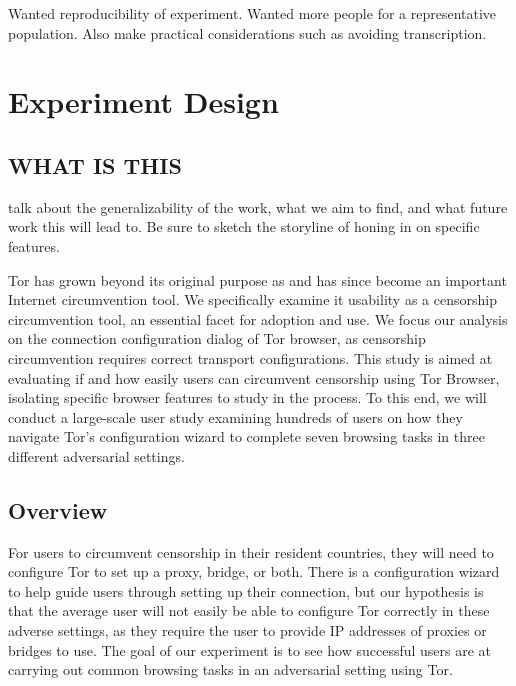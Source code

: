 \documentclass[letterpaper,twocolumn,10pt]{article}
\begin{document}
Wanted reproducibility of experiment.
Wanted more people for a representative population. 
Also make practical considerations such as avoiding transcription. 

\section{Experiment Design}

\subsection{WHAT IS THIS}

 talk about the generalizability of the work, what we aim to find, and what future work this will lead to. Be sure to sketch the storyline of honing in on specific features. 

Tor has grown beyond its original purpose as and has 
since become an important Internet circumvention tool.
We specifically examine it usability as a censorship circumvention tool,
an essential facet for adoption and use.  
We focus our analysis on the connection configuration dialog of Tor browser,
as censorship circumvention requires correct transport configurations. %
This study is aimed at evaluating 
if and how easily users can circumvent censorship using Tor Browser,
isolating specific browser features to study in the process. 
To this end, we will conduct a large-scale user study examining hundreds of users 
on how they navigate Tor's configuration wizard to complete seven browsing tasks 
in three different adversarial settings. 

\subsection{Overview}
For users to circumvent censorship in their resident countries, they will need to configure Tor to set up a proxy, bridge, or both. There is a configuration wizard to help guide users through setting up their connection, but our hypothesis is that the average user will not easily be able to configure Tor correctly in these adverse settings, as they require the user to provide IP addresses of proxies or bridges to use. The goal of our experiment is to see how successful users are at carrying out common browsing tasks in an adversarial setting using Tor. 
\end{document}
